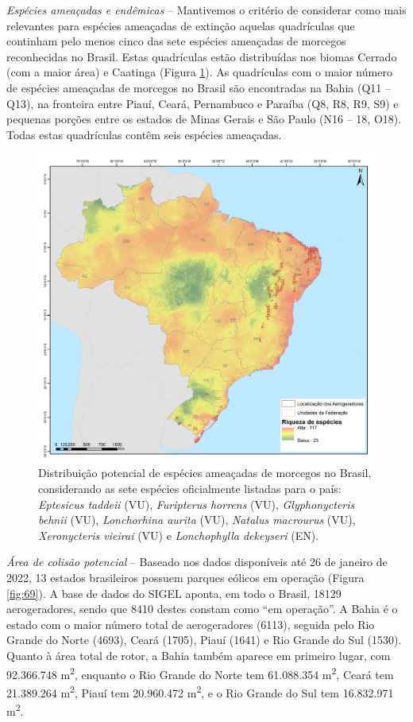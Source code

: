 \documentclass[
  oneside]{scrbook}
\begin{document}
\emph{Espécies ameaçadas e endêmicas} -- Mantivemos o critério de considerar como mais relevantes para espécies ameaçadas de extinção aquelas quadrículas que continham pelo menos cinco das sete espécies ameaçadas de morcegos reconhecidas no Brasil. Estas quadrículas estão distribuídas nos biomas Cerrado (com a maior área) e Caatinga (Figura \ref{fig:68}). As quadrículas com o maior número de espécies ameaçadas de morcegos no Brasil são encontradas na Bahia (Q11 -- Q13), na fronteira entre Piauí, Ceará, Pernambuco e Paraíba (Q8, R8, R9, S9) e pequenas porções entre os estados de Minas Gerais e São Paulo (N16 -- 18, O18). Todas estas quadrículas contêm seis espécies ameaçadas.

\begin{figure}[H]

{\centering \includegraphics[width=0.75\linewidth]{imagens/cap09/Figura_9.2} 

}

\caption{Distribuição potencial de espécies ameaçadas de morcegos no Brasil, considerando as sete espécies oficialmente listadas para o país: \emph{Eptesicus taddeii} (VU), \emph{Furipterus horrens} (VU), \emph{Glyphonycteris behnii} (VU), \emph{Lonchorhina aurita} (VU), \emph{Natalus macrourus} (VU), \emph{Xeronycteris vieirai} (VU) e \emph{Lonchophylla dekeyseri} (EN).}\label{fig:68}
\end{figure}



\emph{Área de colisão potencial} -- Baseado nos dados disponíveis até 26 de janeiro de 2022, 13 estados brasileiros possuem parques eólicos em operação (Figura \ref{fig:69}). A base de dados do SIGEL aponta, em todo o Brasil, 18129 aerogeradores, sendo que 8410 destes constam como ``em operação''. A Bahia é o estado com o maior número total de aerogeradores (6113), seguida pelo Rio Grande do Norte (4693), Ceará (1705), Piauí (1641) e Rio Grande do Sul (1530). Quanto à área total de rotor, a Bahia também aparece em primeiro lugar, com 92.366.748 m\textsuperscript{2}, enquanto o Rio Grande do Norte tem 61.088.354 m\textsuperscript{2}, Ceará tem 21.389.264 m\textsuperscript{2}, Piauí tem 20.960.472 m\textsuperscript{2}, e o Rio Grande do Sul tem 16.832.971 m\textsuperscript{2}.
\end{document}
